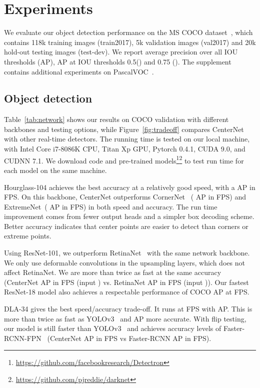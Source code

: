 \documentclass[10pt,twocolumn,letterpaper]{article}
\begin{document}
\section{Experiments}

We evaluate our object detection performance on the MS COCO dataset~\cite{lin2014microsoft}, which contains 118k training images (train2017), 5k validation images (val2017) and 20k hold-out testing images (test-dev).
We report average precision over all IOU thresholds (AP), AP at IOU thresholds 0.5() and 0.75 (). 
The supplement contains additional experiments on PascalVOC~\cite{pascal-voc-2012}.



\subsection{Object detection}
Table~\ref{tab:network} shows our results on COCO validation with different backbones and testing options, while Figure~\ref{fig:tradeoff} compares CenterNet with other real-time detectors.
The running time is tested on our local machine, with Intel Core i7-8086K CPU, Titan Xp GPU, Pytorch 0.4.1, CUDA 9.0, and CUDNN 7.1.
We download code and pre-trained models\footnote{\url{https://github.com/facebookresearch/Detectron}}\footnote{\url{https://github.com/pjreddie/darknet}} to test run time for each model on the same machine.

Hourglass-104 achieves the best accuracy at a relatively good speed, with a  AP in  FPS.
On this backbone, CenterNet outperforms CornerNet~\cite{Law_2018_ECCV} ( AP in  FPS) and ExtremeNet~\cite{zhou2019bottomup}( AP in  FPS) in both speed and accuracy.
The run time improvement comes from fewer output heads and a simpler box decoding scheme.
Better accuracy indicates that center points are easier to detect than corners or extreme points.

Using ResNet-101, we outperform RetinaNet~\cite{lin2018focal} with the same network backbone.
We only use deformable convolutions in the upsampling layers, which does not affect RetinaNet.
We are more than twice as fast at the same accuracy (CenterNet AP in  FPS (input ) vs. RetinaNet AP in  FPS (input )).
Our fastest ResNet-18 model also achieves a respectable performance of  COCO AP at  FPS.

DLA-34 gives the best speed/accuracy trade-off. 
It runs at FPS with AP.
This is more than twice as fast as YOLOv3~\cite{redmon2018yolov3} and AP more accurate.
With flip testing, our model is still faster than YOLOv3~\cite{redmon2018yolov3} and achieves accuracy levels of Faster-RCNN-FPN~\cite{ren2015faster} (CenterNet  AP  in  FPS vs Faster-RCNN  AP in  FPS).
\end{document}
